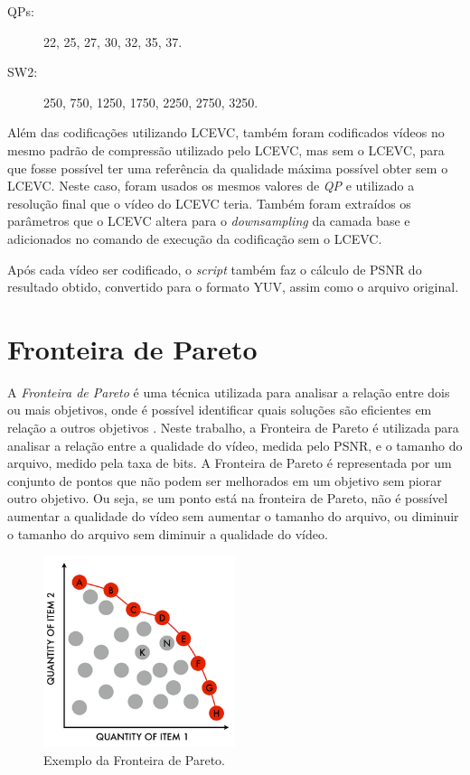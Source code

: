 \begin{description}
\item[QPs:] 22, 25, 27, 30, 32, 35, 37.
\item[SW2:] 250, 750, 1250, 1750, 2250, 2750, 3250.
\end{description}

Além das codificações utilizando \acrshort{LCEVC}, também foram codificados vídeos no mesmo
padrão de compressão utilizado pelo \acrshort{LCEVC}, mas sem o \acrshort{LCEVC}, para que fosse possível 
ter uma referência da qualidade máxima possível obter sem o \acrshort{LCEVC}. Neste caso, foram usados
os mesmos valores de \textit{QP} e utilizado a resolução final que o vídeo do \acrshort{LCEVC} teria.
Também foram extraídos os parâmetros que o LCEVC altera para o \textit{downsampling} da camada
base e adicionados no comando de execução da codificação sem o \acrshort{LCEVC}.

Após cada vídeo ser codificado, o \textit{script} também faz o cálculo de \acrfull{PSNR} do resultado obtido,
convertido para o formato YUV, assim como o arquivo original.

\section{Fronteira de Pareto}

A \textit{Fronteira de Pareto} é uma técnica utilizada para analisar a relação entre dois ou mais
objetivos, onde é possível identificar quais soluções são eficientes em relação a
outros objetivos \cite{pareto_definition}. Neste trabalho, a Fronteira de Pareto é utilizada para analisar a relação
entre a qualidade do vídeo, medida pelo \acrshort{PSNR}, e o tamanho do arquivo, medido pela taxa de bits.
A Fronteira de Pareto é representada por um conjunto de pontos que não podem ser melhorados em um
objetivo sem piorar outro objetivo. Ou seja, se um ponto está na fronteira de Pareto, não é possível
aumentar a qualidade do vídeo sem aumentar o tamanho do arquivo, ou diminuir o tamanho do arquivo sem
diminuir a qualidade do vídeo.

\begin{figure}[t]
    \centering
    \includegraphics[width=0.5\textwidth]{img/pareto-2.png}
    \caption{Exemplo da Fronteira de Pareto. \cite{pareto_img}}
    \label{fig:pareto}
\end{figure}

